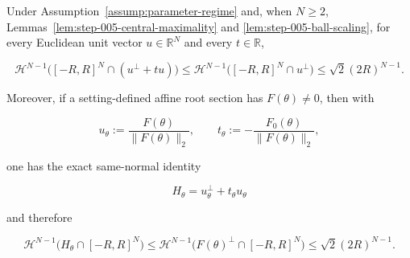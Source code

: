 \begin{proposition}
\label{prop:step-005-translated-section-certificate}
Under Assumption~\ref{assump:parameter-regime} and, when \(N\geq2\), Lemmas~\ref{lem:step-005-central-maximality} and \ref{lem:step-005-ball-scaling}, for every Euclidean unit vector \(u\in\mathbb R^N\) and every \(t\in\mathbb R\),

\begin{equation}
\label{eq:appendix-display-164}
\mathcal H^{N-1}\bigl([-R,R]^N\cap(u^\perp+tu)\bigr)
\leq
\mathcal H^{N-1}\bigl([-R,R]^N\cap u^\perp\bigr)
\leq\sqrt2(2R)^{N-1}.
\end{equation}

Moreover, if a setting-defined affine root section has \(F(\theta)\ne0\), then with

\begin{equation}
\label{eq:appendix-display-165}
u_\theta:=\frac{F(\theta)}{\|F(\theta)\|_2},
\qquad
t_\theta:=-\frac{F_0(\theta)}{\|F(\theta)\|_2},
\end{equation}

one has the exact same-normal identity

\begin{equation}
\label{eq:appendix-display-166}
H_\theta=u_\theta^\perp+t_\theta u_\theta
\end{equation}

and therefore

\begin{equation}
\label{eq:appendix-display-167}
\mathcal H^{N-1}\bigl(H_\theta\cap[-R,R]^N\bigr)
\leq
\mathcal H^{N-1}\bigl(F(\theta)^\perp\cap[-R,R]^N\bigr)
\leq\sqrt2(2R)^{N-1}.
\end{equation}


\end{proposition}

